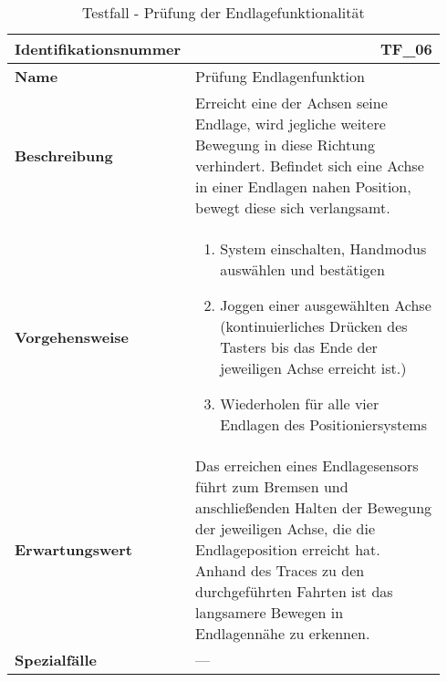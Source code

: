 \documentclass[../../../Bachelorarbeit.tex]{subfiles}
\begin{document}
\begin{table}[H]
    \centering
    \begin{tabular}{ p{0.34\linewidth}  p{0.6\linewidth} }
        \hline
        \textbf{Identifikationsnummer}  & \multicolumn{1}{r}{TF\_06} \\ \hline
        \textbf{Name}                   & Prüfung Endlagenfunktion \\
        \textbf{Beschreibung}           & Erreicht eine der Achsen seine Endlage, wird jegliche weitere Bewegung in diese Richtung verhindert. Befindet sich eine Achse in einer Endlagen nahen Position, bewegt diese sich verlangsamt. \\
        \textbf{Vorgehensweise}         &   {\begin{enumerate}[noitemsep,topsep=0pt,parsep=0pt,partopsep=0pt,leftmargin=*]
                                                \item System einschalten, Handmodus auswählen und bestätigen
                                                \item Joggen einer ausgewählten Achse (kontinuierliches Drücken des Tasters bis das Ende der jeweiligen Achse erreicht ist.)
                                                \item Wiederholen für alle vier Endlagen des Positioniersystems
                                            \end{enumerate}} \\
        \textbf{Erwartungswert}         & Das erreichen eines Endlagesensors führt zum Bremsen und anschließenden Halten der Bewegung der jeweiligen Achse, die die Endlageposition erreicht hat. Anhand des Traces zu den durchgeführten Fahrten ist das langsamere Bewegen in Endlagennähe zu erkennen. \\
        \textbf{Spezialfälle}           & --- \\ \hline
    \end{tabular}
    \caption[\acs{tf} - Endlagenfunktion]{Testfall - Prüfung der Endlagefunktionalität}
    \label{tab:my-table66}
\end{table}
\end{document}
